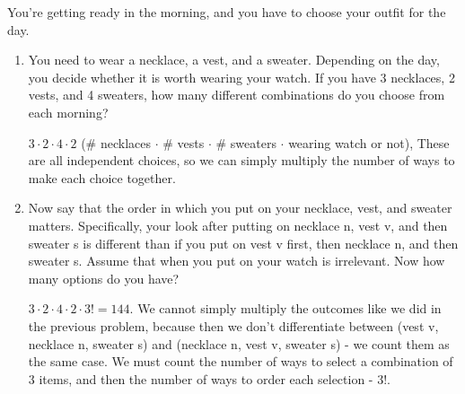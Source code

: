 \question 
\vspace{2 mm}
You're getting ready in the morning, and you have to choose your outfit for the day.
\begin{enumerate}[label=(\alph*)]
\item
You need to wear a necklace, a vest, and a sweater. Depending on the day, you decide whether it is worth wearing your watch. If you have 3 necklaces, 2 vests, and 4 sweaters, how many different combinations do you choose from each morning?

\begin{solution}[.3 in]
$3 \cdot 2 \cdot 4  \cdot 2 $ (\# necklaces $\cdot$ \# vests  $\cdot$ \# sweaters $\cdot$ wearing watch or not), 
These are all independent choices, so we can simply multiply the number of ways to make each choice together.
\end{solution}

\item Now say that the order in which you put on your necklace, vest, and sweater matters. Specifically, your look after putting on necklace n, vest v, and then sweater s is different than if you put on vest v first, then necklace n, and then sweater s. Assume that when you put on your watch is irrelevant. Now how many options do you have?

\begin{solution}
$3 \cdot 2 \cdot 4  \cdot 2 \cdot 3! = 144$. We cannot simply multiply the outcomes like we did in the previous problem, because then we don't differentiate between (vest v, necklace n, sweater s) and (necklace n, vest v, sweater s) - we count them as the same case. We must count the number of ways to select a combination of 3 items, and then the number of ways to order each selection - 3!. 
\end{solution}

\end{enumerate}